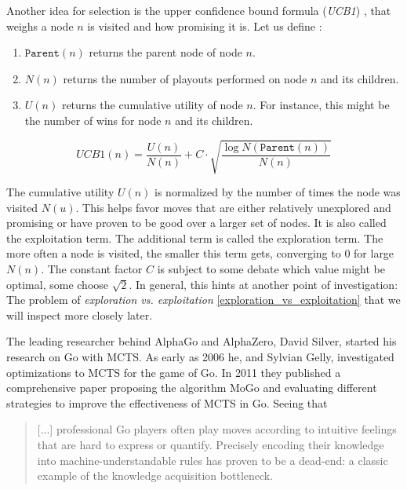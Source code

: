 Another idea for selection is the upper confidence bound formula (\textit{UCB1}) \cite{auer_finite-time_nodate}, that weighs a node $n$ is visited and how promising it is. Let us define \cite[cf. p. 328]{russell_artificial_2021}:

\begin{enumerate}
    \item $\texttt{Parent}(n)$ returns the parent node of node $n$.
    \item $N(n) $ returns the number of playouts performed on node $n$ and its children.
    \item $U(n) $ returns the cumulative utility of node $n$. For instance, this might be the number of wins for node $n$ and its children.
\end{enumerate}

\begin{equation}
    \textit{UCB1}(n) = \frac{U(n)}{N(n)} + C \cdot \sqrt{\frac{\log{N(\texttt{Parent}(n))}}{N(n)}}
    \label{eq:UCB1}
\end{equation}

The cumulative utility $U(n)$ is normalized by the number of times the node was visited $N(u)$. This helps favor moves that are either relatively unexplored and promising or have proven to be good over a larger set of nodes. It is also called the exploitation term. The additional term is called the exploration term. The more often a node is visited, the smaller this term gets, converging to $0$ for large $N(n)$. The constant factor $C$ is subject to some debate which value might be optimal, some choose $\sqrt{2}$. In general, this hints at another point of investigation: The problem of \textit{exploration vs. exploitation} \ref{exploration_vs_exploitation} that we will inspect more closely later.

The leading researcher behind AlphaGo and AlphaZero, David Silver, started his research on Go with MCTS. As early as 2006 he, and Sylvian Gelly, investigated optimizations to MCTS \cite{gelly_achieving_nodate} for the game of Go. In 2011 they published a comprehensive paper \cite{gelly_monte-carlo_2011} proposing the algorithm MoGo and evaluating different strategies to improve the effectiveness of MCTS in Go. Seeing that

\begin{quotation}
    [...] professional Go players often play moves according to intuitive feelings that are hard to express or quantify. Precisely encoding their knowledge into machine-understandable rules has proven to be a dead-end: a classic example of the knowledge acquisition bottleneck. \cite[p. 1873]{gelly_monte-carlo_2011}
\end{quotation}

